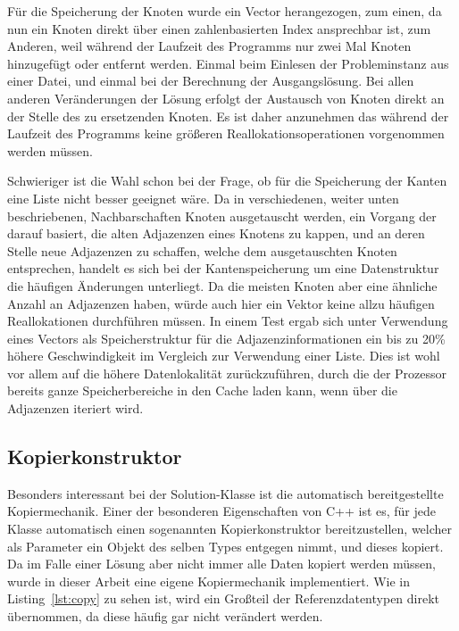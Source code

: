 Für die Speicherung der Knoten wurde ein Vector herangezogen, zum einen, da nun ein Knoten direkt über einen zahlenbasierten Index ansprechbar ist, zum Anderen, weil während der Laufzeit des Programms nur
zwei Mal Knoten hinzugefügt oder entfernt werden. Einmal beim Einlesen der Probleminstanz aus einer Datei, und einmal bei der Berechnung der Ausgangslösung. Bei allen anderen Veränderungen der Lösung erfolgt
der Austausch von Knoten direkt an der Stelle des zu ersetzenden Knoten. Es ist daher anzunehmen das während der Laufzeit des Programms keine größeren Reallokationsoperationen vorgenommen werden müssen.

Schwieriger ist die Wahl schon bei der Frage, ob für die Speicherung der Kanten eine Liste nicht besser geeignet wäre. Da in verschiedenen, weiter unten beschriebenen, Nachbarschaften Knoten ausgetauscht werden,
ein Vorgang der darauf basiert, die alten Adjazenzen eines Knotens zu kappen, und an deren Stelle neue Adjazenzen zu schaffen, welche dem ausgetauschten Knoten entsprechen, handelt es sich bei der Kantenspeicherung
um eine Datenstruktur die häufigen Änderungen unterliegt. Da die meisten Knoten aber eine ähnliche Anzahl an Adjazenzen haben, würde auch hier ein Vektor keine allzu häufigen Reallokationen durchführen müssen.
In einem Test ergab sich unter Verwendung eines Vectors als Speicherstruktur für die Adjazenzinformationen ein bis zu 20\% höhere Geschwindigkeit im Vergleich zur Verwendung einer Liste. Dies ist wohl vor allem
auf die höhere Datenlokalität zurückzuführen, durch die der Prozessor bereits ganze Speicherbereiche in den Cache laden kann, wenn über die Adjazenzen iteriert wird.

\subsection{Kopierkonstruktor}
\label{sec:copy}

Besonders interessant bei der Solution-Klasse ist die automatisch bereitgestellte Kopiermechanik. Einer der besonderen Eigenschaften von C++ ist es, für jede Klasse automatisch einen sogenannten Kopierkonstruktor
bereitzustellen, welcher als Parameter ein Objekt des selben Types entgegen nimmt, und dieses kopiert. Da im Falle einer Lösung aber nicht immer alle Daten kopiert werden müssen, wurde in dieser Arbeit eine
eigene Kopiermechanik implementiert. Wie in Listing~\ref{lst:copy} zu sehen ist, wird ein Großteil der Referenzdatentypen direkt übernommen, da diese häufig gar nicht verändert werden. 

